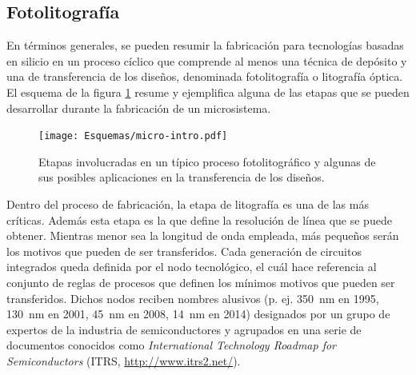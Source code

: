 	\subsection{Fotolitografía}

		En términos generales, se pueden resumir la fabricación para tecnologías basadas en silicio en un proceso cíclico que comprende al menos una técnica de depósito y una de transferencia de los diseños, denominada fotolitografía o litografía óptica. El esquema de la figura \ref{fig:micro-intro} resume y ejemplifica alguna de las etapas que se pueden desarrollar durante la fabricación de un microsistema.
		
 			\begin{figure}[b!]
 				\begin{center}
 				\texttt{[image: Esquemas/micro-intro.pdf]}
 				\caption[Etapas de los procesos de microfabricación]{Etapas involucradas en un típico proceso fotolitográfico y algunas de sus posibles aplicaciones en la transferencia de los diseños.}
 		   		\label{fig:micro-intro}
 		    	\end{center}
 		    	\end{figure}
	
		Dentro del proceso de fabricación, la etapa de litografía es una de las más críticas. Además esta etapa es la que define la resolución de línea que se puede obtener. Mientras menor sea la longitud de onda empleada, más pequeños serán los motivos que pueden de ser transferidos. Cada generación de circuitos integrados queda definida por el nodo tecnológico, el cuál hace referencia al conjunto de reglas de procesos que definen los mínimos motivos que pueden ser transferidos. Dichos nodos reciben nombres alusivos (p. ej. \SI{350}{nm} en 1995, \SI{130}{nm} en 2001, \SI{45}{nm} en 2008, \SI{14}{nm} en 2014) designados por un grupo de expertos de la industria de semiconductores y agrupados en una serie de documentos conocidos como \textit{International Technology Roadmap for Semiconductors} (ITRS, \url{http://www.itrs2.net/}).\cite{gargini2000}


